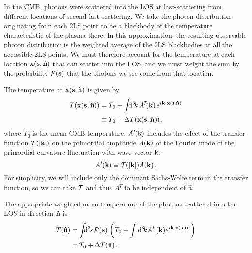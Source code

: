 \documentclass[fleqn,usenatbib]{mnras}
\begin{document}
    In the CMB, photons were scattered into the LOS at last-scattering from
    different locations of second-last scattering.  We take the photon
    distribution originating from each 2LS point to be a blackbody of the
    temperature characteristic of the plasma there.  In this approximation, the
    resulting observable photon distribution is the weighted average of the 2LS
    blackbodies at all the accessible 2LS points.  We must therefore account for
    the temperature at each location $\mathbf{x}(\mathbf{s},{\bf\hat{n}})$ that can scatter
    into the LOS, and we must weight the sum by the probability
    $\mathcal{P}(\mathbf{s})$ that the photons we see come from that
    location.\footnotemark

    The temperature at $\mathbf{x}(\mathbf{s}, {\bf\hat{n}})$ is given by
    \begin{align} \label{eqn:Tofx}
        T(\mbf{x}(\mbf{s}, \nhat))
            &=
                  T_0
                + \int \!\!\!\dif[3]{k} \, A^{\!\mcal{T}\!\!}(\mbf{k}) \, \Exp{i \mbf{k} \cdot \mbf{x}(\mbf{s}, \nhat)} \\
            &\equiv
                  T_0
                + \DeltaT(\mbf{x}(\mbf{s}, \nhat))\,, \nonumber
    \end{align}
    where $T_0$ is the mean CMB temperature.  $A^{\!\mathcal{T}\!\!}(\mathbf{k})$
    includes the effect of the transfer function $\mathcal{T}(\lvert \mathbf{k} \rvert)$ on
    the primordial amplitude $A(\mathbf{k})$ of the Fourier mode of the primordial
    curvature fluctuation with wave vector $\mathbf{k}$:
    \begin{equation}
        A^{\!\mathcal{T}\!\!}(\mathbf{k})\equiv \mathcal{T}(\lvert \mathbf{k} \rvert) A(\mathbf{k}) \,.
    \end{equation}
    For simplicity, we will include only the dominant Sachs-Wolfe term in the
    transfer function, so we can take $\mathcal{T}$ and thus $A^{\!\mathcal{T}\!\!}$
    to be independent of $\hat{n}$.

    The appropriate weighted mean temperature of the photons scattered into the
    LOS in direction ${\bf\hat{n}}$ is
    \begin{align}
        \bar{T}(\nhat)
            &=
                \int\!\!\!\dif[3]{s}\, \mcal{P}(\mbf{s})\, \left(
                      T_0
                    + \int \dif[3]{k} A^{\!\mcal{T}}(\mbf{k}) \Exp{i\mbf{k}\cdot\mbf{x}(\mbf{s},\nhat)}
                \right)
            \\
            &=
                T_0 + \Delta \bar{T}(\nhat) \,.
    \end{align}
\end{document}
